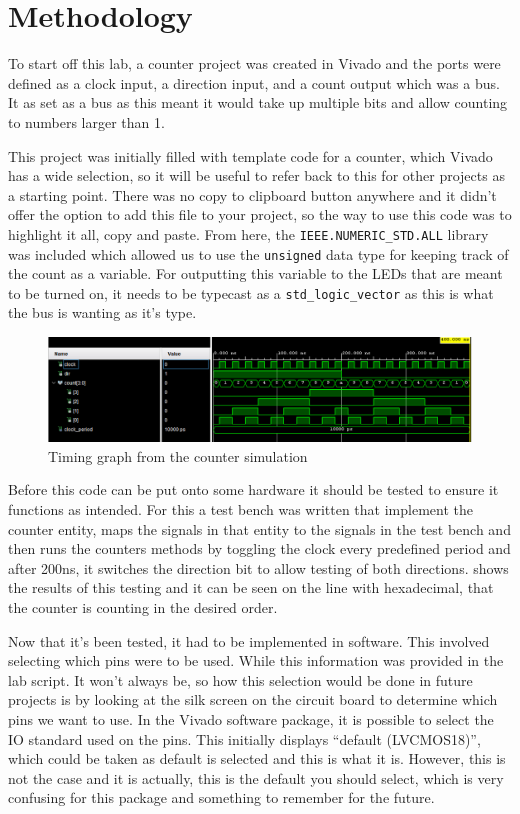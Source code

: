 \documentclass[a4paper, 12pt]{article}
\begin{document}
	\section{Methodology}
		To start off this lab, a counter project was created in Vivado and the ports were defined as a clock input, a direction input, and a count output which was a bus. It as set as a bus as this meant it would take up multiple bits and allow counting to numbers larger than 1. 
		\par
		This project was initially filled with template code for a counter, which Vivado has a wide selection, so it will be useful to refer back to this for other projects as a starting point. There was no copy to clipboard button anywhere and it didn't offer the option to add this file to your project, so the way to use this code was to highlight it all, copy and paste. From here, the \lstinline{IEEE.NUMERIC_STD.ALL} library was included which allowed us to use the \lstinline{unsigned} data type for keeping track of the count as a variable. For outputting this variable to the LEDs that are meant to be turned on, it needs to be typecast as a \lstinline{std_logic_vector} as this is what the bus is wanting as it's type.
		\par
		\begin{figure}[!ht]
			\centering
			\includegraphics[width=0.9\columnwidth]{lab1Counter.PNG}
			\caption{Timing graph from the counter simulation}
			\label{fig:graph}
		\end{figure}
		Before this code can be put onto some hardware it should be tested to ensure it functions as intended. For this a test bench was written that implement the counter entity, maps the signals in that entity to the signals in the test bench and then runs the counters methods by toggling the clock every predefined period and after 200ns, it switches the direction bit to allow testing of both directions.  shows the results of this testing and it can be seen on the line with hexadecimal, that the counter is counting in the desired order. 
		\par
		Now that it's been tested, it had to be implemented in software. This involved selecting which pins were to be used. While this information was provided in the lab script. It won't always be, so how this selection would be done in future projects is by looking at the silk screen on the circuit board to determine which pins we want to use. In the Vivado software package, it is possible to select the IO standard used on the pins. This initially displays ``default (LVCMOS18)'', which could be taken as default is selected and this is what it is. However, this is not the case and it is actually, this is the default you should select, which is very confusing for this package and something to remember for the future.
\end{document}
